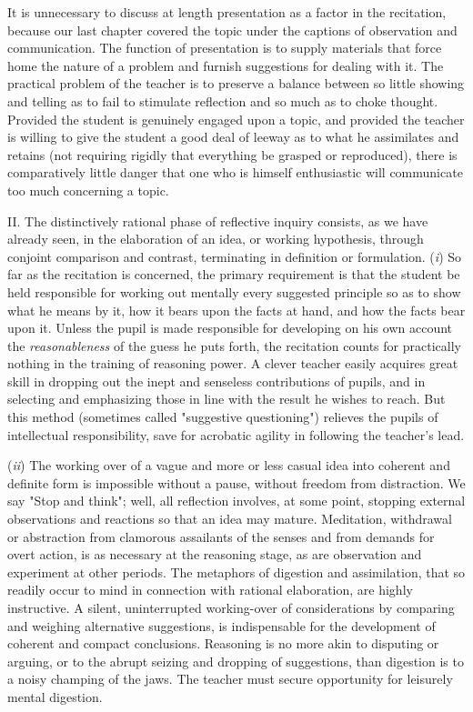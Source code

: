 \documentclass[letterpaper]{book}
\begin{document}

It is unnecessary to discuss at length presentation as a factor in the
recitation, because our last chapter covered the topic under the
captions of observation and communication. The function of presentation
is to supply materials that force home the nature of a problem and
furnish suggestions for dealing with it. The practical problem of the
teacher is to preserve a balance between so little showing and telling
as to fail to stimulate reflection and so much as to choke thought.
Provided the student is genuinely engaged upon a topic, and provided the
teacher is willing to give the student a good deal of leeway as to what
he assimilates and retains (not requiring rigidly that everything be
grasped or
reproduced),
there is comparatively little danger that one who is himself
enthusiastic will communicate too much concerning a topic.


II. The distinctively rational phase of reflective inquiry consists, as
we have already seen, in the elaboration of an idea, or working
hypothesis, through conjoint comparison and contrast, terminating in
definition or formulation. (\emph{i}) So far as the recitation is
concerned, the primary requirement is that the student be held
responsible for working out mentally every suggested principle so as to
show what he means by it, how it bears upon the facts at hand, and how
the facts bear upon it. Unless the pupil is made responsible for
developing on his own account the \emph{reasonableness} of the guess he
puts forth, the recitation counts for practically nothing in the
training of reasoning power. A clever teacher easily acquires great
skill in dropping out the inept and senseless contributions of pupils,
and in selecting and emphasizing those in line with the result he wishes
to reach. But this method (sometimes called "suggestive questioning")
relieves the pupils of intellectual responsibility, save for acrobatic
agility in following the teacher's lead.


(\emph{ii}) The working over of a vague and more or less casual idea
into coherent and definite form is impossible without a pause, without
freedom from distraction. We say "Stop and think"; well, all reflection
involves, at some point, stopping external observations and reactions so
that an idea may mature. Meditation, withdrawal or abstraction from
clamorous assailants of the senses and from demands for overt action, is
as necessary at the reasoning stage, as are observation and experiment
at other periods. The metaphors of digestion
and
assimilation, that so readily occur to mind in connection with rational
elaboration, are highly instructive. A silent, uninterrupted
working-over of considerations by comparing and weighing alternative
suggestions, is indispensable for the development of coherent and
compact conclusions. Reasoning is no more akin to disputing or arguing,
or to the abrupt seizing and dropping of suggestions, than digestion is
to a noisy champing of the jaws. The teacher must secure opportunity for
leisurely mental digestion.
\end{document}
